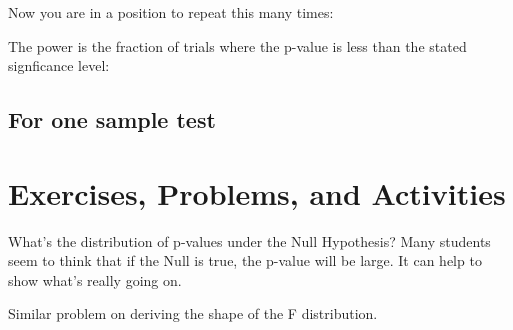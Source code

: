 Now you are in a position to repeat this many times:
\begin{knitrout}
\end{knitrout}


The power is the fraction of trials where the p-value is less than the
stated signficance level:
\begin{knitrout}
\end{knitrout}


\subsection{For one sample test}



\section{Exercises, Problems, and Activities}


\begin{problem}
What's the distribution of p-values under the Null Hypothesis?
Many students seem to think that if the Null is true, the p-value will
be large.  It can help to show what's really going on.

Similar problem on deriving the shape of the F distribution.

\end{problem}

\shipoutProblems

